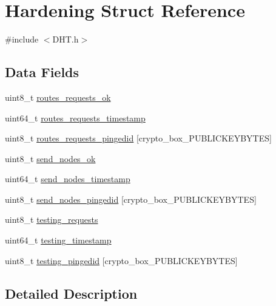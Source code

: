 \hypertarget{struct_hardening}{\section{Hardening Struct Reference}
\label{struct_hardening}
}


{\ttfamily \#include $<$D\+H\+T.\+h$>$}

\subsection*{Data Fields}
\begin{DoxyCompactItemize}
\item 
uint8\+\_\+t \hyperlink{struct_hardening_a3bc4c156861571ceca55275d95f6221b}{routes\+\_\+requests\+\_\+ok}
\item 
uint64\+\_\+t \hyperlink{struct_hardening_a55d6293fa06a8c4aa24e70706409b060}{routes\+\_\+requests\+\_\+timestamp}
\item 
uint8\+\_\+t \hyperlink{struct_hardening_aee791c81812d61023e3ecc7ebc33f4c0}{routes\+\_\+requests\+\_\+pingedid} \mbox{[}crypto\+\_\+box\+\_\+\+P\+U\+B\+L\+I\+C\+K\+E\+Y\+B\+Y\+T\+E\+S\mbox{]}
\item 
uint8\+\_\+t \hyperlink{struct_hardening_a11158e002f3685f4044a759680636c08}{send\+\_\+nodes\+\_\+ok}
\item 
uint64\+\_\+t \hyperlink{struct_hardening_ab15e3d8f0b33943a6978fac3cde4d1a2}{send\+\_\+nodes\+\_\+timestamp}
\item 
uint8\+\_\+t \hyperlink{struct_hardening_a2c2bfa7e3ff42e353bc44a2183ebc4df}{send\+\_\+nodes\+\_\+pingedid} \mbox{[}crypto\+\_\+box\+\_\+\+P\+U\+B\+L\+I\+C\+K\+E\+Y\+B\+Y\+T\+E\+S\mbox{]}
\item 
uint8\+\_\+t \hyperlink{struct_hardening_a48c7621d77e824da8df2c8a7caa79d25}{testing\+\_\+requests}
\item 
uint64\+\_\+t \hyperlink{struct_hardening_a3de9f4ec78dd99c4ca1a142e1c65fcee}{testing\+\_\+timestamp}
\item 
uint8\+\_\+t \hyperlink{struct_hardening_a4756e4396c1fe15e6ba6bdac38a60eee}{testing\+\_\+pingedid} \mbox{[}crypto\+\_\+box\+\_\+\+P\+U\+B\+L\+I\+C\+K\+E\+Y\+B\+Y\+T\+E\+S\mbox{]}
\end{DoxyCompactItemize}


\subsection{Detailed Description}


